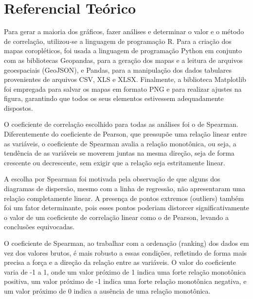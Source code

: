 \chapter{Referencial Teórico}

Para gerar a maioria dos gráficos, fazer análises e determinar o valor e o método de correlação, utilizou-se a linguagem de programação R. Para a criação dos mapas coropléticos, foi usada a linguagem de programação Python em conjunto com as bibliotecas Geopandas, para a geração dos mapas e a leitura de arquivos geoespaciais (GeoJSON), e Pandas, para a manipulação dos dados tabulares provenientes de arquivos CSV, XLS e XLSX. Finalmente, a biblioteca Matplotlib foi empregada para salvar os mapas em formato PNG e para realizar ajustes na figura, garantindo que todos os seus elementos estivessem adequadamente dispostos.

O coeficiente de correlação escolhido para todas as análises foi o de Spearman. Diferentemente do coeficiente de Pearson, que pressupõe uma relação linear entre as variáveis, o coeficiente de Spearman avalia a relação monotônica, ou seja, a tendência de as variáveis se moverem juntas na mesma direção, seja de forma crescente ou decrescente, sem exigir que a relação seja estritamente linear.

A escolha por Spearman foi motivada pela observação de que alguns dos diagramas de dispersão, mesmo com a linha de regressão, não apresentaram uma relação completamente linear. A presença de pontos extremos (outliers) também foi um fator determinante, pois esses pontos poderiam distorcer significativamente o valor de um coeficiente de correlação linear como o de Pearson, levando a conclusões equivocadas. 

O coeficiente de Spearman, ao trabalhar com a ordenação (ranking) dos dados em vez dos valores brutos, é mais robusto a essas condições, refletindo de forma mais precisa a força e a direção da relação entre as variáveis. O valor do coeficiente varia de -1 a 1, onde um valor próximo de 1 indica uma forte relação monotônica positiva, um valor próximo de -1 indica uma forte relação monotônica negativa, e um valor próximo de 0 indica a ausência de uma relação monotônica.
